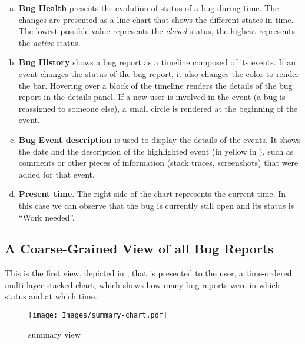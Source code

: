 \begin{enumerate}[(a)]

\item \label{item-ecg} \textbf{Bug Health} presents the evolution of status of a bug during time. The changes are presented as a line chart that shows the different states in time. The lowest possible value represents the \textit{closed} status, the highest represents the \textit{active} status.

\item \label{item-timeline} \textbf{Bug History} shows a bug report as a timeline composed of its events. If an event changes the status of the bug report, it also changes the color to render the bar. Hovering over a block of the timeline renders the details of the bug report in the details panel. If a new user is involved in the event (\eg a bug is reassigned to someone else), a small circle is rendered at the beginning of the event.
  
\item \label{item-description} \textbf{Bug Event description} is used to display the details of the events. It shows the date and the description of the highlighted event (in yellow in ), such as comments or other pieces of information (\eg stack traces, screenshots) that were added for that event.

\item \textbf{Present time}. The right side of the chart represents the current time. In this case we can observe that the bug is currently still open and its status is ``Work needed''.

\end{enumerate}

\subsection{A Coarse-Grained View of all Bug Reports}

This is the first view, depicted in , that is presented to the user, a time-ordered multi-layer stacked chart, which shows how many bug reports were in which status and at which time. 

\begin{figure}[ht]
\centering
\texttt{[image: Images/summary-chart.pdf]}
\caption{\ib summary view}
\label{fig-inbug-resume}
\end{figure}

